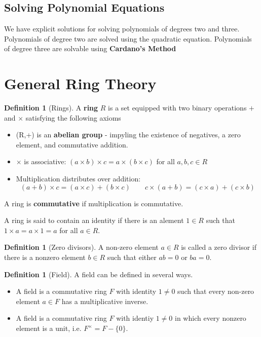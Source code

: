\documentclass[10pt, oneside, reqno]{amsart}
\theoremstyle{plain}%
\theoremstyle{definition}
\newtheorem{defn}[thm]{Definition}
\theoremstyle{remark}
\begin{document}
\subsection{Solving Polynomial Equations} %
\label{sub:solving_polynomial_equations}
We have explicit solutions for solving polynomials of degrees two and three. Polynomials of degree two are solved using the quadratic equation.  Polynomials of degree three are solvable using \textbf{Cardano's Method}



\section{General Ring Theory} %
\label{cha:general_ring_theory}

\begin{defn}[Rings]
	A \textbf{ring} $R$ is a set equipped with two binary operations $+$ and $\times$ satisfying the following axioms
	\begin{itemize}
		\item (R,+) is an \textbf{abelian group} -  impyling the existence of negatives, a zero element, and commutative addition.
		\item $\times$ is associative: $(a \times b) \times c = a \times (b \times c)$ for all $a,b,c \in R$
		\item Multiplication distributes over addition: \[
			(a + b) \times c  = (a \times c) + (b \times c) \qquad c \times (a + b) = (c \times a) + (c \times b)
		\]
	\end{itemize}
	
	A ring is \textbf{commutative} if multiplication is commutative.  
	
	A ring is said to contain an identity if there is an alement $1 \in R$ such that $1 \times a = a \times 1 = a$ for all $a \in R$.
\end{defn}

\begin{defn}[Zero divisors]
	A non-zero element $a \in R$ is called a zero divisor if there is a nonzero element $b \in R$ such that either $ab = 0$ or $ba = 0$. 
\end{defn}

\begin{defn}[Field]
	A field can be defined in several ways.
	\begin{itemize}
		\item A field is a commutative ring $F$ with identity $1 \neq 0$ such that every non-zero element $a \in F$ has a multiplicative inverse.
		\item A field is a commutative ring $F$ with identiy $1 \neq 0$ in which every nonzero element is a unit, i.e. $F^{\times} = F - \{0\}$.
	\end{itemize}
\end{defn}
\end{document}
